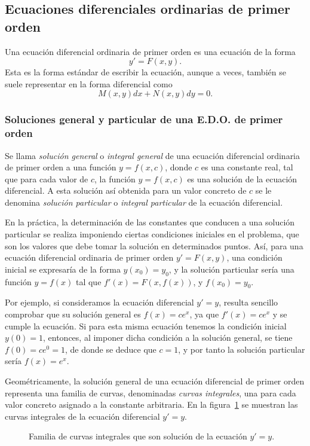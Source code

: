 \subsection{Ecuaciones diferenciales ordinarias de primer orden}
Una ecuación diferencial ordinaria de primer orden es una ecuación de la forma
\[
y'=F(x,y).
\]
Esta es la forma estándar de escribir la ecuación, aunque a veces, también se suele representar en la forma diferencial como
\[
M(x,y)dx+N(x,y)dy=0.
\]

\subsubsection*{Soluciones general y particular de una E.D.O. de primer orden}
Se llama \emph{solución general} o \emph{integral general} de una ecuación diferencial ordinaria de primer orden a una
función $y=f(x,c)$, donde $c$ es una constante real, tal que para cada valor de $c$, la función $y=f(x,c)$ es una
solución de la ecuación diferencial. 
A esta solución así obtenida para un valor concreto de $c$ se le denomina \emph{solución particular} o \emph{integral
particular} de la ecuación diferencial.

En la práctica, la determinación de las constantes que conducen a una solución particular se realiza imponiendo ciertas
condiciones iniciales en el problema, que son los valores que debe tomar la solución en determinados puntos. 
Así, para una ecuación diferencial ordinaria de primer orden $y'=F(x,y)$, una condición inicial se expresaría de la
forma $y(x_{0})=y_{0}$, y la solución particular sería una función $y=f(x)$ tal que $f'(x)=F(x,f(x))$, y $f(x_0)=y_0$.

Por ejemplo, si consideramos la ecuación diferencial $y'=y$, resulta sencillo comprobar que su solución general es
$f(x)=ce^x$, ya que $f'(x)=ce^x$ y se cumple la ecuación. 
Si para esta misma ecuación tenemos la condición inicial $y(0)=1$, entonces, al imponer dicha condición a la solución
general, se tiene $f(0)=ce^0=1$, de donde se deduce que $c=1$, y por tanto la solución particular sería $f(x)=e^x$.

Geométricamente, la solución general de una ecuación diferencial de primer orden representa una familia de curvas,
denominadas \emph{curvas integrales}, una para cada valor concreto asignado a la constante arbitraria. 
En la figura~\ref{g:curvas integrales} se muestran las curvas integrales de la ecuación diferencial $y'=y$.

\begin{figure}[h!]
\begin{center}
\scalebox{1}{}
\caption{Familia de curvas integrales que son solución de la ecuación $y'=y$.}
\label{g:curvas integrales}
\end{center}
\end{figure}

